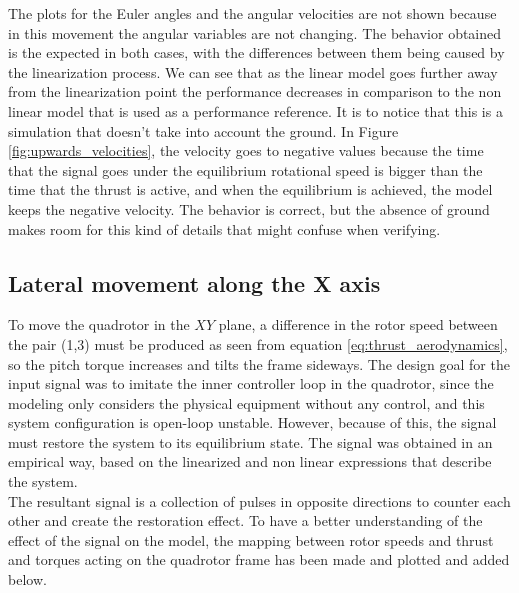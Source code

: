 The plots for the Euler angles and the angular velocities are not shown because in this movement the angular variables are not changing. The behavior obtained is the expected in both cases, with the differences between them being caused by the linearization process. We can see that as the linear model goes further away from the linearization point the performance decreases in comparison to the non linear model that is used as a performance reference. It is to notice that this is a simulation that doesn't take into account the ground. In Figure \ref{fig:upwards_velocities}, the velocity goes to negative values because the time that the signal goes under the equilibrium rotational speed is bigger than the time that the thrust is active, and when the equilibrium is achieved, the model keeps the negative velocity. The behavior is correct, but the absence of ground makes room for this kind of details that might confuse when verifying. \newpage

\subsection{Lateral movement along the X axis}

To move the quadrotor in the $XY$ plane, a difference in the rotor speed between the pair (1,3) must be produced as seen from equation \ref{eq:thrust_aerodynamics}, so the pitch torque increases and tilts the frame sideways. The design goal for the input signal was to imitate the inner controller loop in the quadrotor, since the modeling only considers the physical equipment without any control, and this system configuration is open-loop unstable. However, because of this, the signal must restore the system to its equilibrium state. The signal was obtained in an empirical way, based on the linearized and non linear expressions that describe the system. \\

The resultant signal is a collection of pulses in opposite directions to counter each other and create the restoration effect. To have a better understanding of the effect of the signal on the model, the mapping between rotor speeds and thrust and torques acting on the quadrotor frame has been made and plotted and added below.

